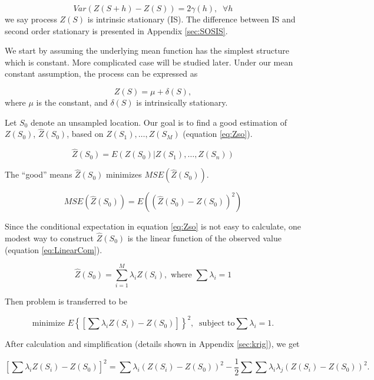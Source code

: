 \documentclass{article}
\begin{document}
\begin{equation}
Var(Z(S+h)-Z(S)) = 2\gamma(h),\;\;\forall h
\end{equation}
we say process $Z(S)$ is intrinsic stationary (IS). The difference between IS and second order stationary is presented in Appendix \ref{sec:SOSIS}.

We start by  assuming the underlying mean function has the simplest structure which is constant. More complicated case will be studied later.  Under our mean constant assumption, the process can be expressed as

\begin{equation}
Z(S) = \mu + \delta(S),
\end{equation}
where $\mu$ is the constant, and $\delta(S)$ is intrinsically stationary.

Let $S_0$ denote an unsampled location. Our goal is to find a good estimation of $Z(S_0)$, $\widehat{Z}(S_0)$, based on $Z(S_1),\dots, Z(S_M)$ (equation \ref{eq:Zso}). 

\begin{equation}\label{eq:Zso}
\widehat{Z}(S_0) = E(Z(S_0)|Z(S_1),\dots,Z(S_n))
\end{equation}

The ``good'' means $\widehat{Z}(S_0)$ minimizes $MSE(\widehat{Z}(S_0))$.

\begin{equation}\label{eq:MSE}
MSE(\widehat{Z}(S_0)) = E((\widehat{Z}(S_0)-Z(S_0))^2)
\end{equation}


Since the conditional expectation in equation \ref{eq:Zso}  is not easy to calculate, one modest way to construct $\widehat{Z}(S_0)$ is the  linear function of the observed value (equation \ref{eq:LinearCom}).

\begin{equation}\label{eq:LinearCom}
\widehat{Z}(S_0) = \sum_{i=1}^M\lambda_i Z(S_i),\,\,\textrm{where }\sum\lambda_i=1
\end{equation}

Then problem is transferred to be 

\begin{equation}
\textrm{minimize } E\left\{\left[\sum\lambda_iZ(S_i)-Z(S_0)\right]\right\}^2,\;\; \textrm{subject to}\sum\lambda_i=1.
\end{equation}


After calculation and simplification (details shown in Appendix \ref{sec:krig}), we get

\begin{equation}\label{eq:simplification}
\left[\sum\lambda_iZ(S_i) - Z(S_0)\right]^2 =\sum\lambda_i(Z(S_i)-Z(S_0))^2 - \frac{1}{2}\sum\sum\lambda_i\lambda_j(Z(S_i)-Z(S_0))^2.
\end{equation}
\end{document}
